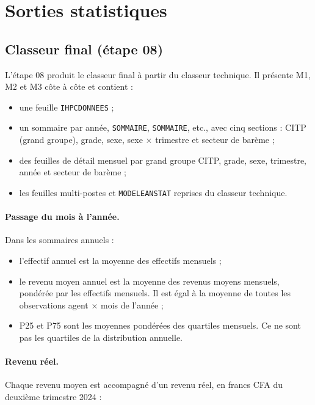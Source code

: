 \documentclass[12pt,a4paper,french]{article}
\renewcommand{\_}{\underscoreorigine\allowbreak}
\begin{document}
\section{Sorties statistiques}

\subsection{Classeur final (étape 08)}

L'étape 08 produit le classeur final à partir du classeur technique. Il présente M1, M2 et M3 côte à côte et contient :

\begin{itemize}
    \item une feuille \texttt{IHPC\_DONNEES} ;
    \item un sommaire par année, \texttt{SOMMAIRE\_2024}, \texttt{SOMMAIRE\_2025}, etc., avec cinq sections : CITP (grand groupe), grade, sexe, sexe $\times$ trimestre et secteur de barème ;
    \item des feuilles de détail mensuel par grand groupe CITP, grade, sexe, trimestre, année et secteur de barème ;
    \item les feuilles multi-postes et \texttt{MODELE\_ANSTAT} reprises du classeur technique.
\end{itemize}

\paragraph{Passage du mois à l'année.} Dans les sommaires annuels :

\begin{itemize}
    \item l'effectif annuel est la moyenne des effectifs mensuels ;
    \item le revenu moyen annuel est la moyenne des revenus moyens mensuels, pondérée par les effectifs mensuels. Il est égal à la moyenne de toutes les observations agent $\times$ mois de l'année ;
    \item P25 et P75 sont les moyennes pondérées des quartiles mensuels. Ce ne sont pas les quartiles de la distribution annuelle.
\end{itemize}

\paragraph{Revenu réel.} Chaque revenu moyen est accompagné d'un revenu réel, en francs CFA du deuxième trimestre 2024 :
\end{document}
